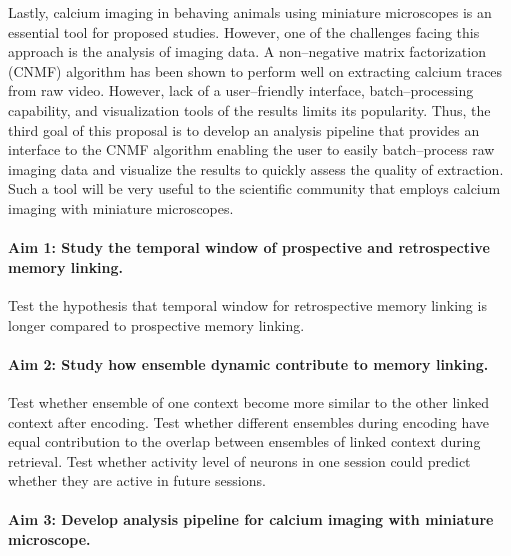 \documentclass[master.tex]{subfiles}
\begin{document}
Lastly, calcium imaging in behaving animals using miniature microscopes is an
essential tool for proposed studies. However, one of the challenges facing this
approach is the analysis of imaging data. A non--negative matrix factorization
(CNMF) algorithm has been shown to perform well on extracting calcium traces
from raw video. However, lack of a user--friendly interface, batch--processing
capability, and visualization tools of the results limits its popularity. Thus,
the third goal of this proposal is to develop an analysis pipeline that provides
an interface to the CNMF algorithm enabling the user to easily batch--process
raw imaging data and visualize the results to quickly assess the quality of
extraction. Such a tool will be very useful to the scientific community that
employs calcium imaging with miniature microscopes.

\paragraph{Aim 1: Study the temporal window of prospective and retrospective
  memory linking.} Test the hypothesis that temporal window for retrospective
memory linking is longer compared to prospective memory linking.

\paragraph{Aim 2: Study how ensemble dynamic contribute to memory linking.} Test
whether ensemble of one context become more similar to the other linked context
after encoding. Test whether different ensembles during encoding have equal
contribution to the overlap between ensembles of linked context during
retrieval. Test whether activity level of neurons in one session could predict
whether they are active in future sessions.

\paragraph{Aim 3: Develop analysis pipeline for calcium imaging with miniature
  microscope.}

\newpage
\end{document}
